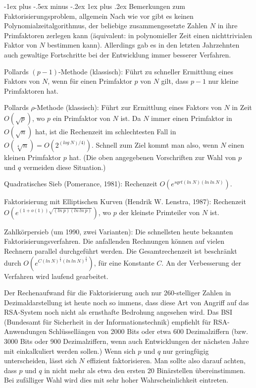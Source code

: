 \documentclass[a4paper]{article}
\makeatletter
\renewcommand{\subsubsection}{\@startsection{subsubsection}{3}{0mm}%
 {-1ex plus -.5ex minus -.2ex}%
 {1ex plus .2ex}%
 {\normalfont\small\bfseries}}
\makeatother
\begin{document}
\begin{multicols}{3}
        \subsubsection{Bemerkungen zum Faktorisierungsproblem, allgemein}
        Nach wie vor gibt es keinen Polynomialzeitalgorithmus, der beliebige zusammengesetzte Zahlen $N$ in ihre Primfaktoren zerlegen kann (äquivalent: in polynomieller
        Zeit einen nichttrivialen Faktor von $N$ bestimmen kann). Allerdings gab es in den letzten Jahrzehnten auch gewaltige Fortschritte bei der Entwicklung immer besserer Verfahren.
        \begin{itemize*}
            \item Pollards $(p-1)$-Methode (klassisch): Führt zu schneller Ermittlung eines Faktors von $N$, wenn für einen Primfaktor $p$ von $N$ gilt, dass $p-1$ nur kleine Primfaktoren hat.
            \item Pollards ${\rho}$-Methode (klassisch): Führt zur Ermittlung eines Faktors von $N$ in Zeit $O(\sqrt{p})$, wo $p$ ein Primfaktor von $N$ ist. Da $N$ immer einen Primfaktor in $O(\sqrt{n})$ hat, ist die Rechenzeit im schlechtesten Fall in $O(\sqrt[4]{n}) =O(2^{(log\ N)/ 4)})$. Schnell zum Ziel kommt man also, wenn $N$ einen kleinen Primfaktor $p$ hat. (Die oben angegebenen Vorschriften zur Wahl von $p$ und $q$ vermeiden diese Situation.)
            \item Quadratisches Sieb (Pomerance, 1981): Rechenzeit $O(e^{sqrt{(ln\ N)(ln\ ln\ N)}})$.
            \item Faktorisierung mit Elliptischen Kurven (Hendrik W. Lenstra, 1987): Rechenzeit $O(e^{(1+o(1)) \sqrt{(ln\ p)(ln\ ln\ p)}})$, wo $p$ der kleinste Primteiler von $N$ ist.
            \item Zahlkörpersieb (um 1990, zwei Varianten): Die schnellsten heute bekannten Faktorisierungsverfahren. Die anfallenden Rechnungen können auf vielen Rechnern parallel durchgeführt werden. Die Gesamtrechenzeit ist beschränkt durch $O(e^{C(ln\ N)^{\frac{1}{3}} (ln\ ln\ N)^{\frac{2}{3}}})$, für eine Konstante $C$. An der Verbesserung der Verfahren wird laufend gearbeitet.
        \end{itemize*}

        Der Rechenaufwand für die Faktorisierung auch nur 260-stelliger Zahlen in Dezimaldarstellung ist heute noch so immens, dass diese Art von Angriff auf das RSA-System noch nicht als ernsthafte Bedrohung angesehen wird. Das BSI (Bundesamt für Sicherheit in der Informationstechnik) empfiehlt für RSA-Anwendungen Schlüssellängen von 2000 Bits oder etwa 600 Dezimalziffern (bzw. 3000 Bits oder 900 Dezimalziffern, wenn auch Entwicklungen der nächsten Jahre mit einkalkuliert werden sollen.)
        Wenn sich $p$ und $q$ nur geringfügig unterscheiden, lässt sich $N$ effizient faktorisieren. Man sollte also darauf achten, dass $p$ und $q$ in nicht mehr als etwa den ersten 20 Binärstellen übereinstimmen. Bei zufälliger Wahl wird dies mit sehr hoher Wahrscheinlichkeit eintreten.


\end{multicols}
\end{document}
